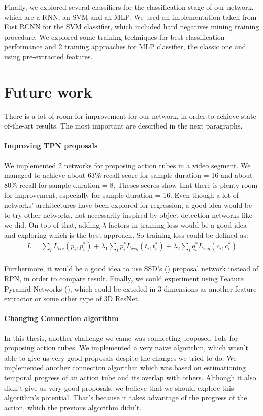 Finally, we explored several classifiers for the classification stage of our network, which are a RNN, an SVM and an MLP.  We used an implementation taken from Fast RCNN
for the SVM classifier, which included hard negatives mining training procedure. We explored some training techniques for best classification performance and
2 training approaches for MLP classifier, the classic one and using pre-extracted features. 

\section{Future work}
There is a lot of room for improvement for our network, in order to achieve state-of-the-art results. The most important are described in the next paragraphs.

\paragraph{Improving TPN proposals} We implemented 2 networks for proposing action tubes in a video segment. We managed to achieve about 63\% recall score for
sample duration = 16 and about 80\% recall for sample duration = 8. Theses scores show that there is plenty room for improvement, especially for sample duration = 16.
Even though a lot of networks' architectures have been explored for regression, a good idea would be to try other networks, not necessarily inspired by object detection
networks like we did. On top of that, adding $\lambda$ factors in training loss would be a good idea and exploring which is the best approach.
So training loss could be defined as:
\begin{equation} 
\begin{split}
 L  =  \sum_iL_{cls}(p_i, p_i^*) + \lambda_1 \sum_ip_i^*L_{reg}(t_i,t_i^*) + \lambda_2  \sum_iq_i^*L_{reg}(c_{i}, c_{i}^*) \\
\end{split}
\end{equation}

Furthermore, it would be a good idea to use SSD's (\cite{DBLP:journals/corr/LiuAESR15}) proposal network instead of RPN, in order to compare result. Finally,
we could experiment using Feature Pyramid Networks (\cite{8099589}), which could be exteded in 3 dimensions as another feature extractor or some other type of 3D ResNet.

\paragraph{Changing Connection algorithm}
In this thesis, another challenge we came was connecting proposed ToIs for proposing action tubes. We implemented a very naive algorithm, which wasn't
able to give us very good proposals despite the changes we tried to do. We implemented another connection algorithm which was based on estimationing temporal
progress of an action tube  and its overlap with others. Although it also didn't give us very good proposals, we believe that we should explore this algorithm's potential. That's
because it takes advantage of the progress of the action, which the previous algorithm didn't.

